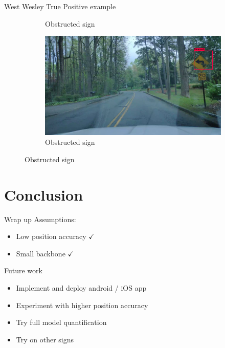 \documentclass{beamer}
\begin{document}
\begin{frame}{West Wesley True Positive example}
\begin{figure}
\begin{center}
\begin{subfigure}[t]{.49\linewidth}
          \caption{Obstructed sign}
          \label{fig:wwObs2TP}
        \end{subfigure}
        \begin{subfigure}[t]{.49\linewidth}
          \centering
          \includegraphics[width=0.99\linewidth]{figures/examples/westwestley/TP/TP05.png}
          \caption{Obstructed sign}
          \label{fig:wwObs3TP}
        \end{subfigure}
        \label{fig:wwTPcases}
      \end{center}
    \end{figure}
\end{frame}{}




\section{Conclusion}
\begin{frame}{Wrap up}
    Assumptions:
    \begin{itemize}
        \item Low position accuracy $\checkmark$
        \item Small backbone $\checkmark$
    \end{itemize}{}
\end{frame}{}

\begin{frame}{Future work}
    \begin{itemize}
        \item Implement and deploy android / iOS app \pause
        \item Experiment with higher position accuracy \pause
        \item Try full model quantification \pause
        \item Try on other signs
    \end{itemize}{}
\end{frame}{}
\end{document}
